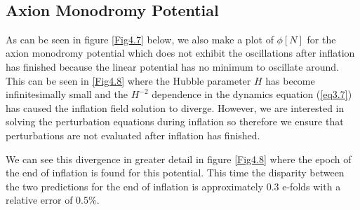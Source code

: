 \documentclass[a4paper,12pt,twoside]{report}
\begin{document}
\noindent%
\begin{minipage}{\linewidth}%
\label{Fig4.6}
\end{minipage}
\\[10pt]

\subsection{Axion Monodromy Potential} \label{subsec:Res_Dyn_Quartic}

As can be seen in figure \ref{Fig4.7} below, we also make a plot of $\phi[N]$ for the axion monodromy potential which does not exhibit the oscillations after inflation has finished because the linear potential has no minimum to oscillate around. This can be seen in \ref{Fig4.8} where the Hubble parameter $H$ has become infinitesimally small and the $H^{-2}$ dependence in the dynamics equation (\ref{eq3.7}) has caused the inflation field solution to diverge. However, we are interested in solving the perturbation equations during inflation so therefore we ensure that perturbations are not evaluated after inflation has finished.

We can see this divergence in greater detail in figure \ref{Fig4.8} where the epoch of the end of inflation is found for this potential. This time the disparity between the two predictions for the end of inflation is approximately 0.3 e-folds with a relative error of 0.5\%.
\end{document}
